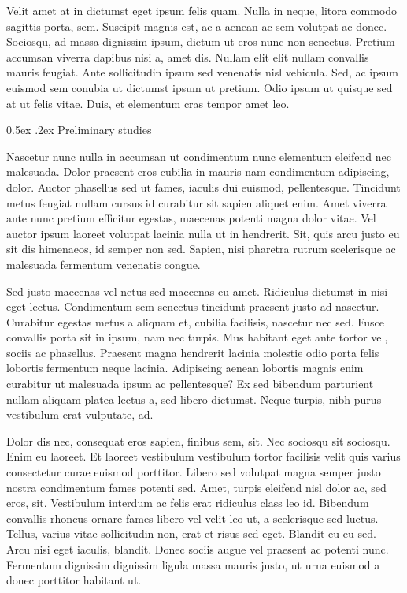 \documentclass[11pt,]{article}
\makeatletter
\renewcommand\subsubsection{
  \@startsection{subsubsection}{3}{\z@}
    {-1.0ex\@plus -1ex \@minus -.2ex}%
    {0.5ex \@plus .2ex}%
    {\normalfont\normalsize\bf}} %
\makeatother
\begin{document}
Velit amet at in dictumst eget ipsum felis quam. Nulla in neque, litora
commodo sagittis porta, sem. Suscipit magnis est, ac a aenean ac sem
volutpat ac donec. Sociosqu, ad massa dignissim ipsum, dictum ut eros
nunc non senectus. Pretium accumsan viverra dapibus nisi a, amet dis.
Nullam elit elit nullam convallis mauris feugiat. Ante sollicitudin
ipsum sed venenatis nisl vehicula. Sed, ac ipsum euismod sem conubia ut
dictumst ipsum ut pretium. Odio ipsum ut quisque sed at ut felis vitae.
Duis, et elementum cras tempor amet leo.

\hypertarget{preliminary-studies}{%
\subsubsection{Preliminary studies}\label{preliminary-studies}}

Nascetur nunc nulla in accumsan ut condimentum nunc elementum eleifend
nec malesuada. Dolor praesent eros cubilia in mauris nam condimentum
adipiscing, dolor. Auctor phasellus sed ut fames, iaculis dui euismod,
pellentesque. Tincidunt metus feugiat nullam cursus id curabitur sit
sapien aliquet enim. Amet viverra ante nunc pretium efficitur egestas,
maecenas potenti magna dolor vitae. Vel auctor ipsum laoreet volutpat
lacinia nulla ut in hendrerit. Sit, quis arcu justo eu sit dis
himenaeos, id semper non sed. Sapien, nisi pharetra rutrum scelerisque
ac malesuada fermentum venenatis congue.

Sed justo maecenas vel netus sed maecenas eu amet. Ridiculus dictumst in
nisi eget lectus. Condimentum sem senectus tincidunt praesent justo ad
nascetur. Curabitur egestas metus a aliquam et, cubilia facilisis,
nascetur nec sed. Fusce convallis porta sit in ipsum, nam nec turpis.
Mus habitant eget ante tortor vel, sociis ac phasellus. Praesent magna
hendrerit lacinia molestie odio porta felis lobortis fermentum neque
lacinia. Adipiscing aenean lobortis magnis enim curabitur ut malesuada
ipsum ac pellentesque? Ex sed bibendum parturient nullam aliquam platea
lectus a, sed libero dictumst. Neque turpis, nibh purus vestibulum erat
vulputate, ad.

Dolor dis nec, consequat eros sapien, finibus sem, sit. Nec sociosqu sit
sociosqu. Enim eu laoreet. Et laoreet vestibulum vestibulum tortor
facilisis velit quis varius consectetur curae euismod porttitor. Libero
sed volutpat magna semper justo nostra condimentum fames potenti sed.
Amet, turpis eleifend nisl dolor ac, sed eros, sit. Vestibulum interdum
ac felis erat ridiculus class leo id. Bibendum convallis rhoncus ornare
fames libero vel velit leo ut, a scelerisque sed luctus. Tellus, varius
vitae sollicitudin non, erat et risus sed eget. Blandit eu eu sed. Arcu
nisi eget iaculis, blandit. Donec sociis augue vel praesent ac potenti
nunc. Fermentum dignissim dignissim ligula massa mauris justo, ut urna
euismod a donec porttitor habitant ut.
\end{document}
